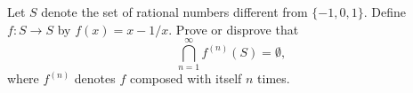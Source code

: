 Let $S$ denote the set of rational numbers different from
$\{-1,0,1\}$.  Define $f:S\rightarrow S$ by $f(x)=x-1/x$.  Prove
or disprove that
\[\bigcap_{n=1}^\infty f^{(n)}(S) = \emptyset,\]
where $f^{(n)}$ denotes $f$ composed with itself $n$ times.
